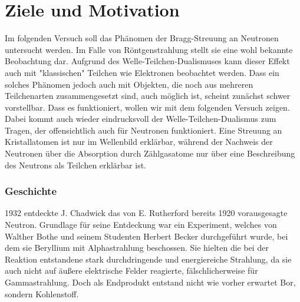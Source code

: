 \section{Ziele und Motivation}

Im folgenden Versuch soll das Phänomen der Bragg-Streuung an Neutronen untersucht werden. Im Falle von Röntgenstrahlung stellt sie eine wohl bekannte Beobachtung dar. Aufgrund des Welle-Teilchen-Dualismuses kann dieser Effekt auch mit "klassischen" Teilchen wie Elektronen beobachtet werden.
Dass ein solches Phänomen jedoch auch mit Objekten, die noch aus mehreren Teilchenarten zusammengesetzt sind, auch möglich ist, scheint zunächst schwer vorstellbar. Dass es funktioniert, wollen wir mit dem folgenden Versuch zeigen. Dabei kommt auch wieder eindrucksvoll der Welle-Teilchen-Dualismus zum Tragen, der offensichtlich auch für Neutronen funktioniert. Eine Streuung an Kristallatomen ist nur im Wellenbild erklärbar, während der Nachweis der Neutronen über die Absorption durch Zählgasatome nur über eine Beschreibung des Neutrons als Teilchen erklärbar ist. 

\subsubsection{Geschichte}

1932 entdeckte J. Chadwick das von E. Rutherford bereits 1920 vorausgesagte Neutron. Grundlage für seine Entdeckung war ein Experiment, welches von Walther Bothe und seinem Studenten Herbert Becker durchgeführt wurde, bei dem sie Beryllium mit Alphastrahlung beschossen. Sie hielten die bei der Reaktion entstandene stark durchdringende und energiereiche Strahlung, da sie auch nicht auf äußere elektrische Felder reagierte, fälschlicherweise für Gammastrahlung. Doch als Endprodukt entstand nicht wie vorher erwartet Bor, sondern Kohlenstoff.

